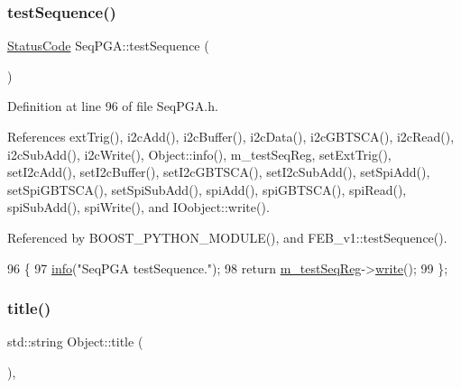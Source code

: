 \subsubsection{\texorpdfstring{test\+Sequence()}{testSequence()}}
{\footnotesize\ttfamily \hyperlink{classStatusCode}{Status\+Code} Seq\+P\+G\+A\+::test\+Sequence (\begin{DoxyParamCaption}{ }\end{DoxyParamCaption})\hspace{0.3cm}{\ttfamily [inline]}}



Definition at line 96 of file Seq\+P\+G\+A.\+h.



References ext\+Trig(), i2c\+Add(), i2c\+Buffer(), i2c\+Data(), i2c\+G\+B\+T\+S\+C\+A(), i2c\+Read(), i2c\+Sub\+Add(), i2c\+Write(), Object\+::info(), m\+\_\+test\+Seq\+Reg, set\+Ext\+Trig(), set\+I2c\+Add(), set\+I2c\+Buffer(), set\+I2c\+G\+B\+T\+S\+C\+A(), set\+I2c\+Sub\+Add(), set\+Spi\+Add(), set\+Spi\+G\+B\+T\+S\+C\+A(), set\+Spi\+Sub\+Add(), spi\+Add(), spi\+G\+B\+T\+S\+C\+A(), spi\+Read(), spi\+Sub\+Add(), spi\+Write(), and I\+Oobject\+::write().



Referenced by B\+O\+O\+S\+T\+\_\+\+P\+Y\+T\+H\+O\+N\+\_\+\+M\+O\+D\+U\+L\+E(), and F\+E\+B\+\_\+v1\+::test\+Sequence().


\begin{DoxyCode}
96                             \{
97     \hyperlink{classObject_a644fd329ea4cb85f54fa6846484b84a8}{info}(\textcolor{stringliteral}{"SeqPGA testSequence."});
98     \textcolor{keywordflow}{return} \hyperlink{classSeqPGA_a7478537516c951a4d08f23b0789ed6d9}{m\_testSeqReg}->\hyperlink{classIOobject_a9f6984bc9f0fadcf800f1be2523ac744}{write}();
99   \};
\end{DoxyCode}
\mbox{\label{classObject_a73a0f1a41828fdd8303dd662446fb6c3}} 
\subsubsection{\texorpdfstring{title()}{title()}}
{\footnotesize\ttfamily std\+::string Object\+::title (\begin{DoxyParamCaption}{ }\end{DoxyParamCaption})\hspace{0.3cm}{\ttfamily [inline]}, {\ttfamily [inherited]}}



